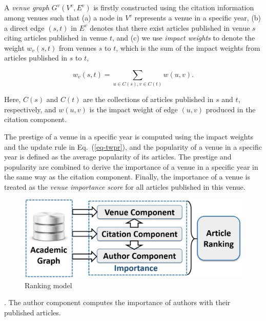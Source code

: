 A {\em venue graph} $G^v(V^v, E^v)$ is firstly constructed using the citation information among venues such that (a) a node in $V^v$ represents a venue in a specific year, (b) a direct edge $(s,t)$ in $E^v$ denotes that there exist articles published in venue $s$ citing articles published in venue $t$, and (c) we use {\em impact weights} to denote the weight $w_v(s,t)$ from venues $s$ to $t$, which is the sum of the impact weights from articles published in $s$ to $t$, \ie
\begin{small}
\begin{equation} \label{eq-infl-weights-v}
w_v(s,t)  = \sum_{u\in C(s), v\in C(t)} w(u,v).
\end{equation}
\end{small}
\noindent
Here, $C(s)$ and $C(t)$ are the collections of articles published in $s$ and $t$, respectively, and $w(u,v)$ is the impact weight of edge $(u, v)$ produced in the citation component.

The prestige of a venue in a specific year is computed using the impact weights and the update rule in Eq.~(\ref{eq-twpr}), and the popularity of a venue in a specific year is defined as the average popularity of its articles. The prestige and popularity are combined to derive the importance of a venue in a specific year in the same way as the citation component. Finally, the importance of a venue is treated as the {\em venue importance score} for all articles published in this venue.


\begin{figure}[tb!]
\centering
\includegraphics[scale=0.15]{fig/framework-lite-2.eps}
\vspace{-2ex}
\caption{\small Ranking model \ensemblerank} \label{fig-rankmodel}
\vspace{-3ex}
\end{figure}



.
The author component computes the importance of authors with their published articles.

